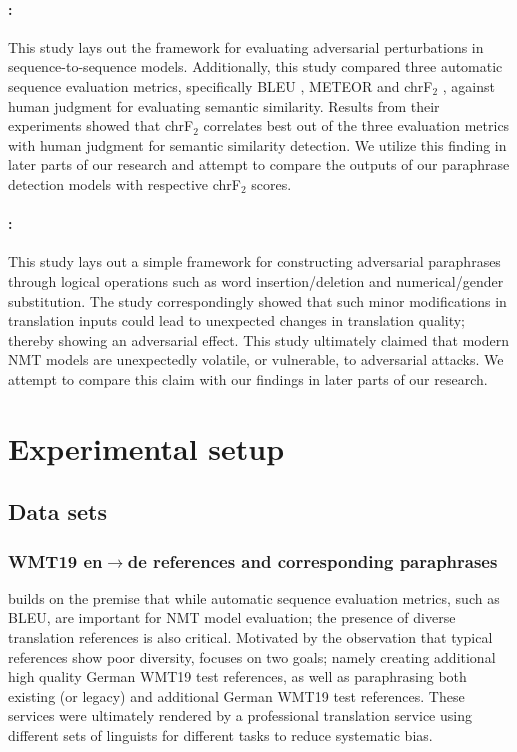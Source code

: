 \documentclass[11pt,a4paper]{article}
\begin{document}
\paragraph{\citet{michel2019evaluation}:} This study lays out the framework for evaluating adversarial perturbations in sequence-to-sequence models. Additionally, this study compared three automatic sequence evaluation metrics, specifically BLEU \cite{papineni2002bleu}, METEOR \cite{denkowski2014meteor} and chrF$_2$ \cite{popovic2015chrf}, against human judgment for evaluating semantic similarity. Results from their experiments showed that chrF$_2$ correlates best out of the three evaluation metrics with human judgment for semantic similarity detection. We utilize this finding in later parts of our research and attempt to compare the outputs of our paraphrase detection models with respective chrF$_2$ scores.

\paragraph{\citet{fadaee2020unreasonable}:} This study lays out a simple framework for constructing adversarial paraphrases through logical operations such as word insertion/deletion and numerical/gender substitution. The study correspondingly showed that such minor modifications in translation inputs could lead to unexpected changes in translation quality; thereby showing an adversarial effect. This study ultimately claimed that modern NMT models are unexpectedly volatile, or vulnerable, to adversarial attacks. We attempt to compare this claim with our findings in later parts of our research. 

\section{Experimental setup}

\subsection{Data sets}

\subsubsection{WMT19 en$\rightarrow$de references and corresponding paraphrases}

\citet{freitag-bleu-paraphrase-references-2020} builds on the premise that while automatic sequence evaluation metrics, such as BLEU, are important for NMT model evaluation; the presence of diverse translation references is also critical. Motivated by the observation that typical references show poor diversity, \citet{freitag-bleu-paraphrase-references-2020} focuses on two goals; namely creating additional high quality German WMT19 test references, as well as paraphrasing both existing (or legacy) and additional German WMT19 test references. These services were ultimately rendered by a professional translation service using different sets of linguists for different tasks to reduce systematic bias.
\end{document}
